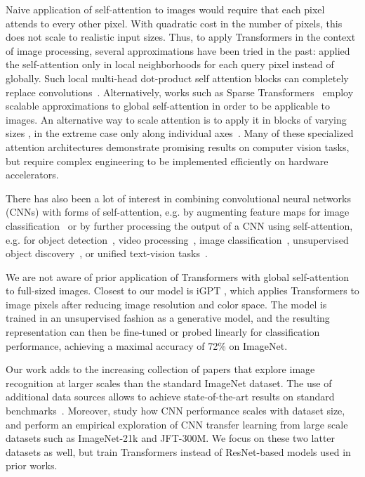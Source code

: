 \documentclass{article} \usepackage{iclr2021_conference,times}
\newcommand{\imagenet}{ImageNet\xspace}
\begin{document}
Naive application of self-attention to images would require that each pixel attends to every other pixel. With quadratic cost in the number of pixels, this does not scale to realistic input sizes.
Thus, to apply Transformers in the context of image processing, several approximations have been tried in the past: \citet{parmar18-imagetransformer} applied the self-attention only in local neighborhoods for each query pixel instead of globally.
Such local multi-head dot-product self attention blocks can completely replace convolutions~\citep{ramachandran19-sasa,cordonnier2020-sacnn,zhao2020-san}.
Alternatively, works such as Sparse Transformers~\citep{child2019-sparsetransformers} employ scalable approximations to global self-attention in order to be applicable to images.
An alternative way to scale attention is to apply it in blocks of varying sizes \citep{weissenborn2019-savm}, in the extreme case only along individual axes~\citep{ho2019-axialattention,wang2020-axialdeeplab}.
Many of these specialized attention architectures demonstrate promising results on computer vision tasks, but require complex engineering to be implemented efficiently on hardware accelerators.

There has also been a lot of interest in combining convolutional neural networks (CNNs) with forms of self-attention, e.g. by augmenting feature maps for image classification~\citep{bello2019-attentionaugmentedcnn} or by further processing the output of a CNN using self-attention, e.g. for object detection~\citep{hu2018-relationnetworks, carion20-detr}, video processing~\citep{wang2018-nonlocalnn,sun2019-videobert}, image classification~\citep{wu2020-visualtransformer}, unsupervised object discovery~\citep{locatello2020-slotattention}, or unified text-vision tasks~\citep{chenuniter,vilbert,visualbert}.

We are not aware of prior application of Transformers with global self-attention to full-sized images.
Closest to our model is iGPT \citep{chen20-igpt}, which applies Transformers to image pixels after reducing image resolution and color space. The model is trained in an unsupervised fashion as a generative model, and the resulting representation can then be fine-tuned or probed linearly for classification performance, achieving a maximal accuracy of 72\% on \imagenet.


Our work adds to the increasing collection of papers that explore image recognition at larger scales than the standard \imagenet dataset.
The use of additional data sources allows to achieve state-of-the-art results on standard benchmarks~\citep{mahajan2018, touvron2019, xie2020-noisystudent}.
Moreover, \citet{sun2017-jft} study how CNN performance scales with dataset size, and \citet{kolesnikov2020-bit, djolonga2020-robustness} perform an empirical exploration of CNN transfer learning from large scale datasets such as ImageNet-21k and JFT-300M.
We focus on these two latter datasets as well, but train Transformers instead of ResNet-based models used in prior works. 
\end{document}
